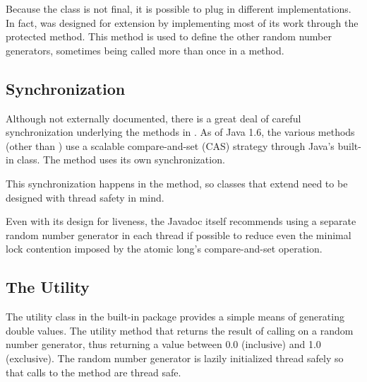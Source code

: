 Because the  class is not final, it is possible to plug
in different implementations.  In fact,  was designed for
extension by implementing most of its work through the protected
 method.  This method is used to define the other
random number generators, sometimes being called more than once in a
method.

\subsection{Synchronization}

Although not externally documented, there is a great deal of careful
synchronization underlying the methods in .  As of Java
1.6, the various  methods (other than
) use a scalable compare-and-set (CAS) strategy
through Java's built-in  class.  The
 method uses its own synchronization.

This synchronization happens in the  method, so
classes that extend  need to be designed with thread
safety in mind. 

Even with its design for liveness, the Javadoc itself recommends using
a separate random number generator in each thread if possible to
reduce even the minimal lock contention imposed by the atomic long's
compare-and-set operation.

\subsection{The  Utility}

The  utility class in the built-in  package
provides a simple means of generating double values.  The utility
method  that returns the result of calling
 on a random number generator, thus returning a
value between 0.0 (inclusive) and 1.0 (exclusive).  The random number
generator is lazily initialized thread safely so that calls to the
method are thread safe.









